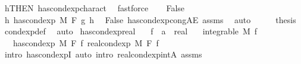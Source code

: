 \begin{isabellebody}
\ h{\isacharbrackleft}{\kern0pt}THEN\ has{\isacharunderscore}{\kern0pt}cond{\isacharunderscore}{\kern0pt}exp{\isacharunderscore}{\kern0pt}charact{\isacharparenleft}{\kern0pt}{}{\isacharparenright}{\kern0pt}{\isacharbrackright}{\kern0pt}\ \isamarkupfalse%
\ fastforce\isanewline
{}\isamarkupfalse%
\isanewline
\ \ \isamarkupfalse%
\ False\isanewline
\ \ \isamarkupfalse%
\ \isamarkupfalse%
\ {\isachardoublequoteopen}{\isasymnexists}h{\isachardot}{\kern0pt}\ has{\isacharunderscore}{\kern0pt}cond{\isacharunderscore}{\kern0pt}exp\ M\ F\ g\ h{\isachardoublequoteclose}\ \isamarkupfalse%
\ False\ has{\isacharunderscore}{\kern0pt}cond{\isacharunderscore}{\kern0pt}exp{\isacharunderscore}{\kern0pt}cong{\isacharunderscore}{\kern0pt}AE\ assms\ \isamarkupfalse%
\ auto\isanewline
\ \ \isamarkupfalse%
\ \isamarkupfalse%
\ {\isacharquery}{\kern0pt}thesis\ \isamarkupfalse%
\ cond{\isacharunderscore}{\kern0pt}exp{\isacharunderscore}{\kern0pt}def\ \isamarkupfalse%
\ auto\isanewline
{}\isamarkupfalse%
%
\endisatagproof
{\isafoldproof}%
%
\isadelimproof
\isanewline
%
\endisadelimproof
\isanewline
{}\isamarkupfalse%
\ has{\isacharunderscore}{\kern0pt}cond{\isacharunderscore}{\kern0pt}exp{\isacharunderscore}{\kern0pt}real{\isacharcolon}{\kern0pt}\isanewline
\ \ \ f\ {\isacharcolon}{\kern0pt}{\isacharcolon}{\kern0pt}\ {\isachardoublequoteopen}{\isacharprime}{\kern0pt}a\ {\isasymRightarrow}\ real{\isachardoublequoteclose}\isanewline
\ \ \ {\isachardoublequoteopen}integrable\ M\ f{\isachardoublequoteclose}\isanewline
\ \ \ {\isachardoublequoteopen}has{\isacharunderscore}{\kern0pt}cond{\isacharunderscore}{\kern0pt}exp\ M\ F\ f\ {\isacharparenleft}{\kern0pt}real{\isacharunderscore}{\kern0pt}cond{\isacharunderscore}{\kern0pt}exp\ M\ F\ f{\isacharparenright}{\kern0pt}{\isachardoublequoteclose}\isanewline
%
\isadelimproof
\ \ %
\endisadelimproof
%
\isatagproof
{}\isamarkupfalse%
\ {\isacharparenleft}{\kern0pt}intro\ has{\isacharunderscore}{\kern0pt}cond{\isacharunderscore}{\kern0pt}expI{\isacharprime}{\kern0pt}{\isacharcomma}{\kern0pt}\ auto\ intro{\isacharbang}{\kern0pt}{\isacharcolon}{\kern0pt}\ real{\isacharunderscore}{\kern0pt}cond{\isacharunderscore}{\kern0pt}exp{\isacharunderscore}{\kern0pt}intA\ assms{\isacharparenright}{\kern0pt}%
\endisatagproof
{\isafoldproof}%
%
\isadelimproof

\end{isabellebody}
